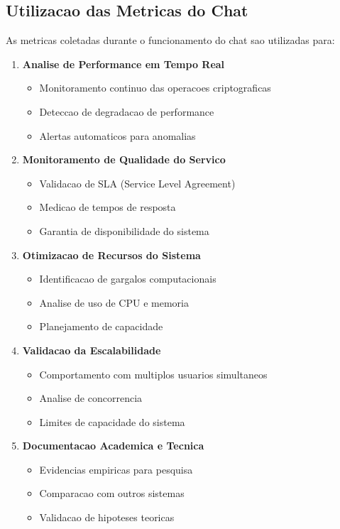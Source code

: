 \documentclass[12pt,a4paper,oneside]{article}
\begin{document}
\subsection{Utilizacao das Metricas do Chat}

As metricas coletadas durante o funcionamento do chat sao utilizadas para:

\begin{enumerate}
    \item \textbf{Analise de Performance em Tempo Real}
    \begin{itemize}
        \item Monitoramento continuo das operacoes criptograficas
        \item Deteccao de degradacao de performance
        \item Alertas automaticos para anomalias
    \end{itemize}
    
    \item \textbf{Monitoramento de Qualidade do Servico}
    \begin{itemize}
        \item Validacao de SLA (Service Level Agreement)
        \item Medicao de tempos de resposta
        \item Garantia de disponibilidade do sistema
    \end{itemize}
    
    \item \textbf{Otimizacao de Recursos do Sistema}
    \begin{itemize}
        \item Identificacao de gargalos computacionais
        \item Analise de uso de CPU e memoria
        \item Planejamento de capacidade
    \end{itemize}
    
    \item \textbf{Validacao da Escalabilidade}
    \begin{itemize}
        \item Comportamento com multiplos usuarios simultaneos
        \item Analise de concorrencia
        \item Limites de capacidade do sistema
    \end{itemize}
    
    \item \textbf{Documentacao Academica e Tecnica}
    \begin{itemize}
        \item Evidencias empiricas para pesquisa
        \item Comparacao com outros sistemas
        \item Validacao de hipoteses teoricas
    \end{itemize}
\end{enumerate}
\end{document}
